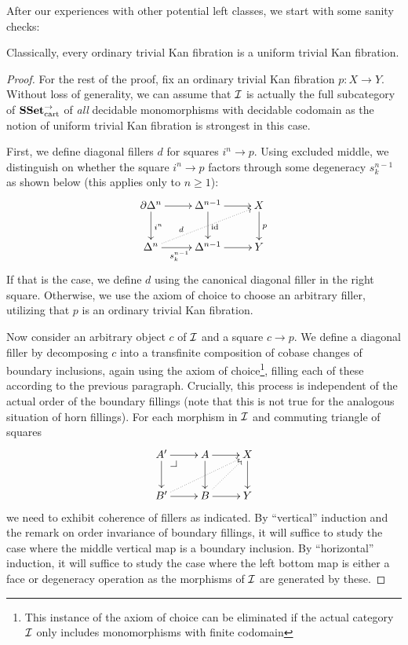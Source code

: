 \documentclass[reqno,10pt,a4paper,oneside]{amsart}
\begin{document}
After our experiences with other potential left classes, we start with some sanity checks:

\begin{lemma}
Classically, every ordinary trivial Kan fibration is a uniform trivial Kan fibration.
\end{lemma}

\begin{proof}
For the rest of the proof, fix an ordinary trivial Kan fibration $p : X \to Y$.
Without loss of generality, we can assume that $\cal{I}$ is actually the full subcategory of $\SSet_{\text{cart}}^{\to}$ of \emph{all} decidable monomorphisms with decidable codomain as the notion of uniform trivial Kan fibration is strongest in this case.

First, we define diagonal fillers $d$ for squares $i^n \to p$.
Using excluded middle, we distinguish on whether the square $i^n \to p$ factors through some degeneracy $s_k^{n-1}$ as shown below (this applies only to $n \geq 1$):
\[
\xymatrix{
  \partial \Delta^n
  \ar[r]
  \ar[d]^{i^n}
&
  \Delta^{n-1}
  \ar[r]
  \ar[d]^{\id}
&
  X
  \ar[d]^{p}
\\
  \Delta^n
  \ar[r]_{s_k^{n-1}}
  \ar@{.>}[urr]^(0.3){d}
&
  \Delta^{n-1}
  \ar[r]
&
  Y
}
\]
If that is the case, we define $d$ using the canonical diagonal filler in the right square.
Otherwise, we use the axiom of choice to choose an arbitrary filler, utilizing that $p$ is an ordinary trivial Kan fibration.

Now consider an arbitrary object $c$ of $\cal{I}$ and a square $c \to p$.
We define a diagonal filler by decomposing $c$ into a transfinite composition of cobase changes of boundary inclusions, again using the axiom of choice\footnote{This instance of the axiom of choice can be eliminated if the actual category $\cal{I}$ only includes monomorphisms with finite codomain}, filling each of these according to the previous paragraph.
Crucially, this process is independent of the actual order of the boundary fillings (note that this is not true for the analogous situation of horn fillings).
For each morphism in $\cal{I}$ and commuting triangle of squares
\[
\xymatrix{
  A'
  \ar[r]
  \ar[d]
  \pullback{dr}
&
  A
  \ar[d]
  \ar[r]
&
  X
  \ar[d]
\\
  B'
  \ar[r]
  \ar@{.>}[urr]
&
  B
  \ar[r]
  \ar@{.>}[ur]
&
  Y
}
\]
we need to exhibit coherence of fillers as indicated.
By ``vertical'' induction and the remark on order invariance of boundary fillings, it will suffice to study the case where the middle vertical map is a boundary inclusion.
By ``horizontal'' induction, it will suffice to study the case where the left bottom map is either a face or degeneracy operation as the morphisms of $\cal{I}$ are generated by these.


\end{proof}
\end{document}
